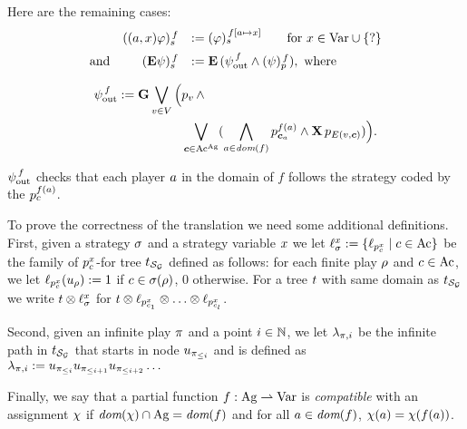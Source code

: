 Here are the remaining cases:
\[
\begin{array}{lrl}
& \tr[f]{\bind{\var}\phi}	& \egdef \tr[{f[\ag\mapsto \var]}]{\phi} \quad\quad
                          \text{for }\var\in\Varf\union\{\unb\}  \\[5pt]
\mbox{and} & \tr[f]{\Eout\psi}	& \egdef \E\,(\psiout[f] \wedge
                                 \trp[f]{\psi}), \mbox{ where}
\end{array}
\]

\begin{align*}
\psiout[f]  \egdef \always
  \bigou_{\pos\in\setpos}\Big( & p_{\pos}\, \et  \\
  & \bigou_{\jmov\in\Mov^{\Agf}} 
  (\biget_{\ag\in\dom(f)}p_{\jmov_{\ag}}^{f(\ag)}\et \X\,
                          p_{\trans(\pos,\jmov)}) \Big ).  
\end{align*}

                      
$\psiout[f]$ checks that  each player $\ag$ in the domain of $f$
follows the strategy coded by the $p_\act^{f(\ag)}$. 

   
To prove the correctness of the translation we need some additional
definitions. First, given a strategy $\strat$ and
a strategy variable $\var$ we
let  $\stratlab{\var}\egdef\{\plab[{p_\act^\var}]\mid
\act\in\Act\}$ be the family of $p_\act^\var$- for tree
$\unfold[\KS_{\CGS}]{}$ defined as follows: for each
finite play $\fplay$ and $\act\in\Act$,
we let $\plab[{p_\act^\var}](\noeud_\fplay)\egdef1$ if $\act\in\strat(\fplay)$, 0 otherwise.
For a  tree $\ltree$ with same domain as
$\unfold[\KS_{\CGS}]{}$ we write $\ltree\prodlab \stratlab{\var}$ for
$\ltree\prodlab \plab[{p_{\act_1}^\var}]\prodlab\ldots\prodlab \plab[{p_{\act_\maxmov}^\var}]$.

Second, given an infinite play $\iplay$ and a point $i\in\setn$, we let
$\tpath_{\iplay,i}$ be the infinite path in
$\unfold[\KS_{\CGS}]{\sstate_{\pos_\init}}$ that starts in node
$\noeud_{\iplay_{\leq i}}$ and is defined as
$\tpath_{\iplay,i}\egdef\noeud_{\iplay_{\leq i}}\noeud_{\iplay_{\leq
    i+1}}\noeud_{\iplay_{\leq i+2}}\ldots$

Finally, we say that a partial   function $f:\Agf\partialto\Varf$ is
\emph{compatible} with an assignment $\assign$ if
 $\dom(\assign)\inter \Agf=\dom(f)$ and  for all $a \in \dom(f)$,  $\assign(a) = \assign(f(a))$.


